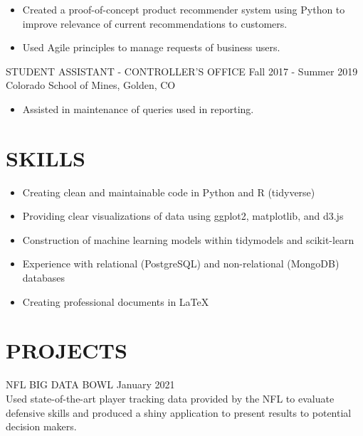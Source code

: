 \documentclass[11pt]{res} %
\begin{document}
\begin{resume}
\begin{itemize}
	\item Created a proof-of-concept product recommender system using Python to improve relevance of current recommendations to customers.
	\item Used Agile principles to manage requests of business users.
\end{itemize}
\vspace{-0.15in}  
STUDENT ASSISTANT - CONTROLLER'S OFFICE \hfill Fall 2017 - Summer 2019 \\
Colorado School of Mines, Golden, CO 

\begin{itemize} 
	\item Assisted in maintenance of queries used in reporting.
\end{itemize}

\vspace{-0.2in}
\hrulefill
\vspace{-0.2in}  
\section{SKILLS}

\begin{itemize} 
	\item Creating clean and maintainable code in Python and R (tidyverse)
	\item Providing clear visualizations of data using ggplot2, matplotlib, and d3.js
	\item Construction of machine learning models within tidymodels and scikit-learn
	\item Experience with relational (PostgreSQL) and non-relational (MongoDB) databases
	\item Creating professional documents in \LaTeX
\end{itemize}

\vspace{-0.2in}
\hrulefill
\vspace{-0.2in}  

\section{PROJECTS}
\begin{hangparas}{.25in}{1}
NFL BIG DATA BOWL \hfill January 2021 \\
Used state-of-the-art player tracking data provided by the NFL to evaluate defensive skills and produced a shiny application to present results to potential decision makers.
	\vspace{-0.15in}  
	

\end{hangparas}
\end{resume}
\end{document}
